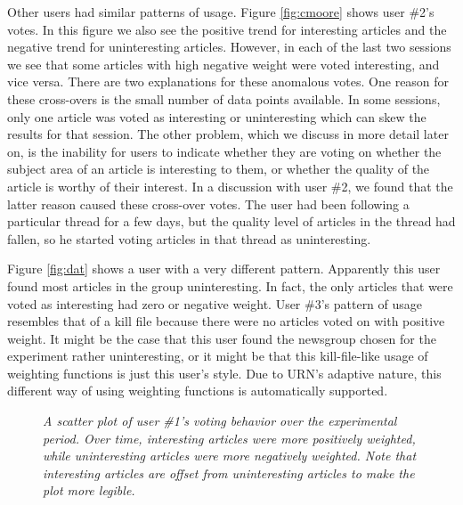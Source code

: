 Other users had similar patterns of usage. Figure \ref{fig:cmoore} shows user
\#2's votes. In this figure we also see the positive trend for interesting
articles and the negative trend for uninteresting articles. However, in each of
the last two sessions we see that some articles with high negative weight were
voted interesting, and vice versa. There are two explanations for these
anomalous votes. One reason for these cross-overs is the small number of data
points available. In some sessions, only one article was voted as interesting
or uninteresting which can skew the results for that session. The other
problem, which we discuss in more detail later on, is the inability for users
to indicate whether they are voting on whether the subject area of an article
is interesting to them, or whether the quality of the article is worthy of
their interest. In a discussion with user \#2, we found that the latter reason
caused these cross-over votes.  The user had been following a particular thread
for a few days, but the quality level of articles in the thread had fallen, so
he started voting articles in that thread as uninteresting.

Figure \ref{fig:dat} shows a user with a very different pattern. Apparently
this user found most articles in the group uninteresting. In fact, the only
articles that were voted as interesting had zero or negative weight. User \#3's
pattern of usage resembles that of a kill file because there were no articles
voted on with positive weight. It might be the case that this user found the
newsgroup chosen for the experiment rather uninteresting, or it might be that
this kill-file-like usage of weighting functions is just this user's style. Due
to URN's adaptive nature, this different way of using weighting functions is
automatically supported.


\begin{figure*}[t]
  {\centerline{}}
  \caption{
  {\em A scatter plot of user \#1's voting behavior over the experimental
  period. Over time, interesting articles were more positively weighted,
  while uninteresting articles were more negatively weighted. Note that
  interesting articles are offset from uninteresting articles to make the
  plot more legible.} }
  \label{fig:johnson}
\end{figure*}

